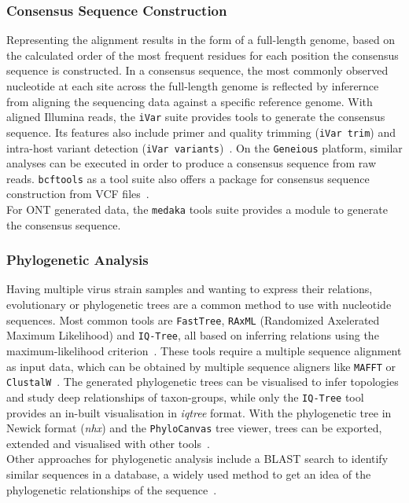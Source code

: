 \subsubsection*{Consensus Sequence Construction}
Representing the alignment results in the form of a full-length genome, based on the calculated order of the most frequent residues for each position the consensus sequence is constructed. In a consensus sequence, the most commonly observed nucleotide at each site across the full-length genome is reflected by inferernce from aligning the sequencing data against a specific reference genome. With aligned Illumina reads, the \texttt{iVar} suite provides tools to generate the consensus sequence. Its features also include primer and quality trimming (\texttt{iVar trim}) and intra-host variant detection (\texttt{iVar variants})~\cite{grubaugh2019amplicon}. On the \texttt{Geneious} platform, similar analyses can be executed in order to produce a consensus sequence from raw reads\cite{kearse2012geneious}. \texttt{bcftools} as a tool suite also offers a package for consensus sequence construction from \ac{VCF} files~\cite{li2009sequence}.\\
For \ac{ONT} generated data, the \texttt{medaka} tools suite provides a module to generate the consensus sequence. 

\subsubsection*{Phylogenetic Analysis}
Having multiple virus strain samples and wanting to express their relations, evolutionary or phylogenetic trees are a common method to use with nucleotide sequences. Most common tools are \texttt{FastTree}, \texttt{RAxML} (Randomized Axelerated Maximum Likelihood) and \texttt{IQ-Tree}, all based on inferring relations using the maximum-likelihood criterion~\cite{price2009fasttree, stamatakis2014raxml, minh2020iq}. These tools require a multiple sequence alignment as input data, which can be obtained by multiple sequence aligners like \texttt{MAFFT} or \texttt{ClustalW}~\cite{katoh2013mafft, thompson2003multiple}. The generated phylogenetic trees can be visualised to infer topologies and study deep relationships of taxon-groups, while only the \texttt{IQ-Tree} tool provides an in-built visualisation in \textit{iqtree} format. With the phylogenetic tree in Newick format (\textit{nhx}) and the \texttt{PhyloCanvas} tree viewer, trees can be exported, extended and visualised with other tools~\cite{abudahab2021phylocanvas}. \\
Other approaches for phylogenetic analysis include a \ac{BLAST} search to identify similar sequences in a database, a widely used method to get an idea of the phylogenetic relationships of the sequence~\cite{altschul1997gapped}.

